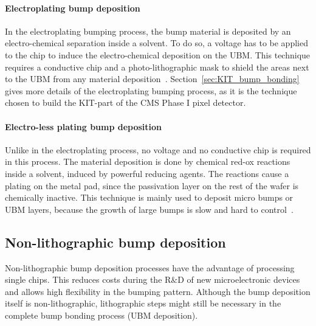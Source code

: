 \paragraph*{Electroplating bump deposition}
In the electroplating bumping process, the bump material is deposited by an electro-chemical separation inside a solvent. To do so, a voltage has to be applied to the chip to induce the electro-chemical deposition on the \ac{UBM}. This technique requires a conductive chip and a photo-lithographic mask to shield the areas next to the \ac{UBM} from any material deposition~\cite{Huf04}. Section~\ref{sec:KIT_bump_bonding} gives more details of the electroplating bumping process, as it is the technique chosen to build the KIT-part of the \ac{CMS} Phase I pixel detector.


\paragraph*{Electro-less plating bump deposition}
Unlike in the electroplating process, no voltage and no conductive chip is required in this process. The material deposition is done by chemical red-ox reactions inside a solvent, induced by powerful reducing agents. The reactions cause a plating on the metal pad, since the passivation layer on the rest of the wafer is chemically inactive. This technique is mainly used to deposit micro bumps or \ac{UBM} layers, because the growth of large bumps is slow and hard to control~\cite{Big07}.

\subsection{Non-lithographic bump deposition}
Non-lithographic bump deposition processes have the advantage of processing single chips. This reduces costs during the R$\&$D of new microelectronic devices and allows high flexibility in the bumping pattern. Although the bump deposition itself is non-lithographic, lithographic steps might still be necessary in the complete bump bonding process (\ac{UBM} deposition).


